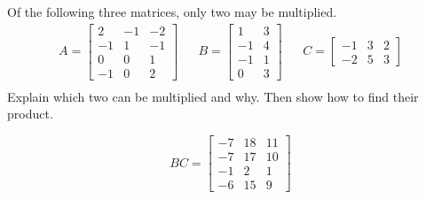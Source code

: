 
\begin{exerciseStatement}


Of the following three matrices, only two may be multiplied. 
\begin{align*} A= \left[\begin{array}{ccc}
2 & -1 & -2 \\
-1 & 1 & -1 \\
0 & 0 & 1 \\
-1 & 0 & 2
\end{array}\right]  & & B= \left[\begin{array}{cc}
1 & 3 \\
-1 & 4 \\
-1 & 1 \\
0 & 3
\end{array}\right]  & & C= \left[\begin{array}{ccc}
-1 & 3 & 2 \\
-2 & 5 & 3
\end{array}\right]  \\ \end{align*}
             Explain which two can be multiplied and why. Then show how to find their product.


\end{exerciseStatement}
    
\begin{exerciseAnswer} 
\[BC= \left[\begin{array}{ccc}
-7 & 18 & 11 \\
-7 & 17 & 10 \\
-1 & 2 & 1 \\
-6 & 15 & 9
\end{array}\right] \]
\end{exerciseAnswer}
    
